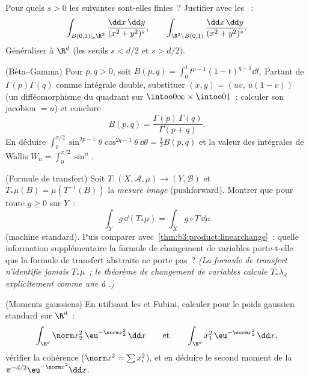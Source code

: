 \begin{exercise}[$\star\star$]\label{exo:b3:product:7}
Pour quels $s > 0$ les suivantes sont-elles finies~? Justifier
avec les ~:
\[
\int_{B(0,1)\subseteq\R^2}\frac{\dd x\,\dd y}{(x^2 +
y^2)^{s}},
\qquad
\int_{\R^2\setminus B(0,1)}\frac{\dd x\,\dd y}{(x^2 +
y^2)^{s}} .
\]
Généraliser à $\R^d$ (les seuils $s < d/2$ et $s > d/2$).
\end{exercise}

\begin{exercise}[$\star\star\star$]\label{exo:b3:product:8}
(Bêta--Gamma) Pour $p, q > 0$, soit $B(p, q) =
\int_0^1t^{p-1}(1 - t)^{q-1}\dd t$. Partant de
$\Gamma(p)\Gamma(q)$ comme intégrale double, substituer $(x,
y) = (uv,\, u(1 - v))$ (un difféomorphisme du quadrant 
sur $\intoo0\infty\times\intoo01$~; calculer son jacobien $=
u$) et conclure
\[
B(p, q) = \frac{\Gamma(p)\,\Gamma(q)}{\Gamma(p + q)} .
\]
En déduire $\int_0^{\pi/2}\sin^{2p-1}\theta\cos^{2q-1}\theta\,
\dd\theta = \frac12B(p,q)$ et la valeur des intégrales de
Wallis $W_n = \int_0^{\pi/2}\sin^n$.
\end{exercise}

\begin{exercise}[$\star\star$]\label{exo:b3:product:9}
(Formule de transfert) Soit $T \colon (X, \mathcal A, \mu)
\to (Y, \mathcal B)$  et $T_*\mu(B) =
\mu(T^{-1}(B))$ la \emph{mesure image}
(pushforward). Montrer que pour toute $g \geq 0$ 
sur $Y$~:
\[
\int_Y g\,\dd(T_*\mu) = \int_X g\circ T\,\dd\mu
\]
(machine standard). Puis comparer
avec~\cref{thm:b3:product:linearchange}~: quelle information
supplémentaire la formule de changement de variables porte-t-elle
que la formule de transfert abstraite ne porte pas~?
\emph{(La formule de transfert n'identifie jamais $T_*\mu$~;
le théorème de changement de variables calcule $T_*\lambda_d$
explicitement comme une  à .)}
\end{exercise}

\begin{exercise}[$\star\star\star$]\label{exo:b3:product:10}
(Moments gaussiens) En utilisant les  et
Fubini, calculer pour le poids gaussien standard sur $\R^d$~:
\[
\int_{\R^d}\norm x_2^2\;\eu^{-\norm x_2^2}\,\dd x
\qquad\text{et}\qquad
\int_{\R^d}x_1^2\,\eu^{-\norm x^2_2}\,\dd x,
\]
vérifier la cohérence ($\norm x^2 = \sum x_i^2$), et en
déduire le second moment de la 
$\pi^{-d/2}\eu^{-\norm x^2}\dd x$.
\end{exercise}

